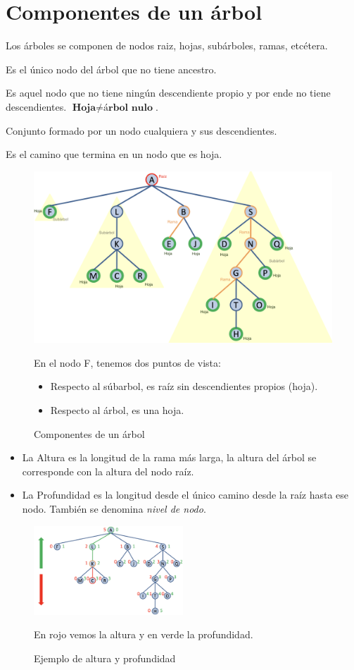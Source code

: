 \section{Componentes de un árbol}

Los árboles se componen de nodos raiz, hojas, subárboles, ramas, etcétera.

 Es el único nodo del árbol que no tiene ancestro.

 Es aquel nodo que no tiene ningún descendiente propio y por ende no tiene descendientes. \(\textbf{Hoja}\neq\textbf{árbol nulo}\).

 Conjunto formado por un nodo cualquiera y sus descendientes.

 Es el camino que termina en un nodo que es hoja.

\begin{figure}[h]
  \begin{center}
    \includegraphics[width=\textwidth]{assets/IntroArboles6.png}
  \end{center}
  \caption{Componentes de un árbol}
  En el nodo F, tenemos dos puntos de vista:
  \begin{itemize}
    \item Respecto al súbarbol, es raíz sin descendientes propios (hoja).
    \item Respecto al árbol, es una hoja.
  \end{itemize}
\end{figure}
\newpage
{}
\begin{itemize}
  \item La Altura es la longitud de la rama más larga, la altura del árbol se corresponde con la altura del nodo raíz.
  \item La Profundidad es la longitud desde el único camino desde la raíz hasta ese nodo. También se denomina \textit{nivel de nodo}.
\end{itemize}

\begin{figure}[h]
  \begin{center}
    \includegraphics[width=0.5\textwidth]{assets/IntroArboles7.png}
  \end{center}
  \caption{Ejemplo de altura y profundidad}
  En rojo vemos la altura y en verde la profundidad.
\end{figure}